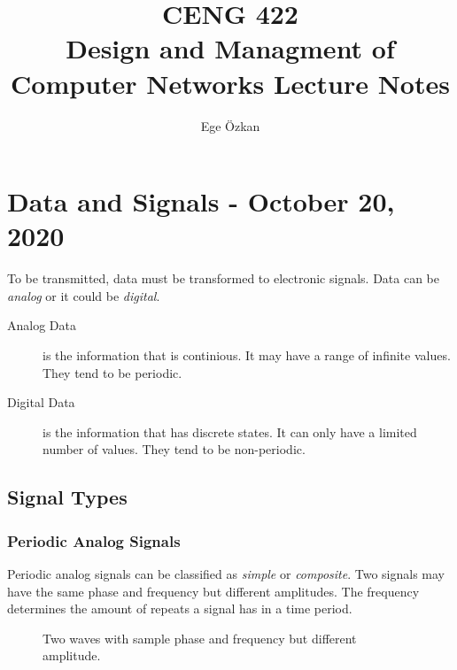 \documentclass[11pt,a4paper,twoside]{book}
\author{Ege Özkan}
\title{CENG 422 \\ \large{Design and Managment of Computer Networks Lecture Notes}}
\begin{document}
\newcommand{\unsure}{\textit{?\textsuperscript{*}}}
\newcommand{\missed}{\textit{!\textsuperscript{*}}}
\maketitle
\chapter{Data and Signals - October 20, 2020}
To be transmitted, data must be transformed to electronic signals. Data can be \textit{analog} or it could be \textit{digital}.

\begin{description}
\item[Analog Data] is the information that is continious. It may have a range of infinite values. They tend to be periodic.
\item[Digital Data] is the information that has discrete states. It can only have a limited number of values. They tend to be non-periodic.
\end{description}

\section{Signal Types}

\subsection{Periodic Analog Signals}

Periodic analog signals can be classified as \textit{simple} or \textit{composite}. Two signals may have the same phase and frequency but different amplitudes. The frequency determines the amount of repeats a signal has in a time period.
\begin{figure}
\caption{Two waves with sample phase and frequency but different amplitude.}
\end{figure}
\end{document}
